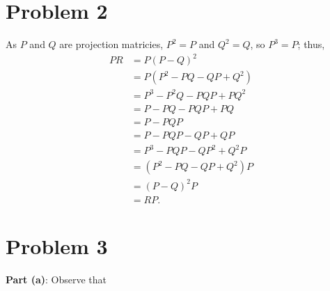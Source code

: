 \documentclass[11pt]{article}
\begin{document}

\section{Problem 2}

As $P$ and $Q$ are projection matricies, $P^{2} = P$ and $Q^{2} = Q$, so $P^{3} = P$; thus,
\begin{align*}
	PR &= P(P - Q)^{2} \\
	   &= P(P^{2} - PQ - QP + Q^{2}) \\
	   &= P^{3} - P^{2}Q - PQP + PQ^{2} \\
	   &= P - PQ - PQP + PQ \\
	   &= P - PQP \\
	   &= P - PQP - QP + QP \\
	   &= P^{3} - PQP - QP^{2} + Q^{2}P \\
	   &= (P^{2} - PQ - QP + Q^{2})P \\
	   &= (P - Q)^{2} P \\
	   &= RP.
\end{align*}


\section{Problem 3}

\textbf{Part (a)}: Observe that 
\end{document}
